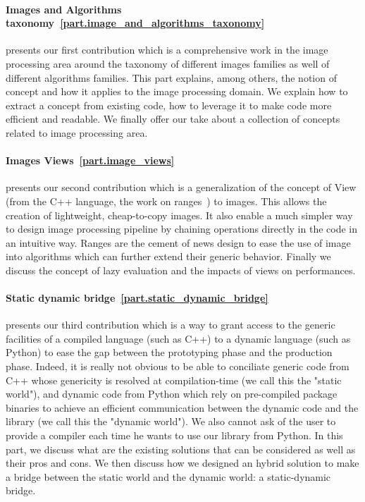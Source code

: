 \paragraph{Images and Algorithms taxonomy~\ref{part.image_and_algorithms_taxonomy}} presents our first contribution
which is a comprehensive work in the image processing area around the taxonomy of different images families as well of
different algorithms families. This part explains, among others, the notion of concept and how it applies to the image
processing domain. We explain how to extract a concept from existing code, how to leverage it to make code more
efficient and readable. We finally offer our take about a collection of concepts related to image processing area.

\paragraph{Images Views~\ref{part.image_views}} presents our second contribution which is a generalization of the
concept of View (from the C++ language, the work on ranges~\parencite{niebler.2018.ranges}) to images. This allows the
creation of lightweight, cheap-to-copy images. It also enable a much simpler way to design image processing pipeline by
chaining operations directly in the code in an intuitive way. Ranges are the cement of news design to ease the use of
image into algorithms which can further extend their generic behavior. Finally we discuss the concept of lazy evaluation
and the impacts of views on performances.

\paragraph{Static dynamic bridge~\ref{part.static_dynamic_bridge}} presents our third contribution which is a way to
grant access to the generic facilities of a compiled language (such as C++) to a dynamic language (such as Python) to
ease the gap between the prototyping phase and the production phase. Indeed, it is really not obvious to be able to
conciliate generic code from C++ whose genericity is resolved at compilation-time (we call this the "static world"), and
dynamic code from Python which rely on pre-compiled package binaries to achieve an efficient communication between the
dynamic code and the library (we call this the "dynamic world"). We also cannot ask of the user to provide a compiler
each time he wants to use our library from Python. In this part, we discuss what are the existing solutions that can be
considered as well as their pros and cons. We then discuss how we designed an hybrid solution to make a bridge between
the static world and the dynamic world: a static-dynamic bridge.
